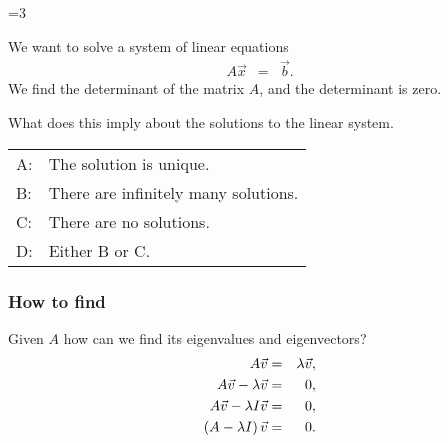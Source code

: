 {\begin{frame}
{        \vfill

     }\fi
   
     \ifnum\value{clickerQuiz}=3{%
        \vfill
        We want to solve a system of linear equations
        \begin{eqnarray*}
          A \vec{x} & = & \vec{b}.
        \end{eqnarray*}
        We find the determinant of the matrix $A$, and the determinant is zero.

        What does this imply about the solutions to the linear system.
        \vfill

        \begin{tabular}{ll}
          A: & The solution is unique. \\
          B: & There are infinitely many solutions. \\
          C: & There are no solutions. \\
          D: & Either B or C. \\
        \end{tabular}

    }\fi
  

\end{frame}
}



\begin{frame}
  \frametitle{How to find}

  Given $A$ how can we find its eigenvalues and eigenvectors?
  \begin{eqnarray*}
    A \vec{v} & = & \lambda \vec{v}, \\
    A \vec{v} - \lambda \vec{v} & = & 0, \\
    A \vec{v} - \lambda I \vec{v} & = & 0, \\
    \left( A - \lambda I \right) \vec{v} & = & 0.
  \end{eqnarray*}


\end{frame}



